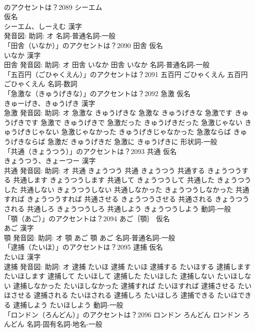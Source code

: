 \documentclass[8pt]{extreport}
\begin{document}
\begin{CJK}{UTF8}{min}
\\	のアクセントは？2089	シーエム
\\	仮名　
\\	シーエム、しーえむ 漢字　
\\	発音図: 助詞: オ							名詞-普通名詞-一般 
\\	「田舎（いなか）」のアクセントは？2090	田舎 仮名　
\\	いなか 漢字　
\\	田舎 発音図: 助詞: オ	田舎 いなか		田舎 いなか				名詞-普通名詞-一般 
\\	「五百円（ごひゃくえん）」のアクセントは？2091		五百円 ごひゃくえん		五百円 ごひゃくえん				名詞-数詞 
\\	「急激な（きゅうげきな）」のアクセントは？2092	急激 仮名　
\\	きゅーげき、きゅうげき 漢字　
\\	急激 発音図: 助詞: オ	急激な きゅうげきな		急激な きゅうげきな 急激です きゅうげきです 急激で きゅうげきで 急激だった きゅうげきだった 急激じゃない きゅうげきじゃない 急激じゃなかった きゅうげきじゃなかった 急激ならば きゅうげきならば 急激だ きゅうげきだ 急激に きゅうげきに				形状詞-一般 
\\	「共通（きょうつう）」のアクセントは？2093	共通 仮名　
\\	きょうつう、きょーつー 漢字　
\\	共通 発音図: 助詞: オ	共通 きょうつう		共通 きょうつう 共通する きょうつうする 共通します きょうつうします 共通して きょうつうして 共通した きょうつうした 共通しない きょうつうしない 共通しなかった きょうつうしなかった 共通すれば きょうつうすれば 共通させる きょうつうさせる 共通される きょうつうされる 共通しろ きょうつうしろ 共通しよう きょうつうしよう				動詞-一般 
\\	「顎（あご）」のアクセントは？2094	あご｛顎｝ 仮名　
\\	あご 漢字　
\\	顎 発音図: 助詞: オ	顎 あご		顎 あご				名詞-普通名詞-一般 
\\	「逮捕（たいほ）」のアクセントは？2095	逮捕 仮名　
\\	たいほ 漢字　
\\	逮捕 発音図: 助詞: オ	逮捕 たいほ		逮捕 たいほ 逮捕する たいほする 逮捕します たいほします 逮捕して たいほして 逮捕した たいほした 逮捕しない たいほしない 逮捕しなかった たいほしなかった 逮捕すれば たいほすれば 逮捕させる たいほさせる 逮捕される たいほされる 逮捕しろ たいほしろ 逮捕できる たいほできる 逮捕しよう たいほしよう				動詞-一般 
\\	「ロンドン（ろんどん）」のアクセントは？2096		ロンドン ろんどん		ロンドン ろんどん				名詞-固有名詞-地名-一般 

\end{CJK}
\end{document}
